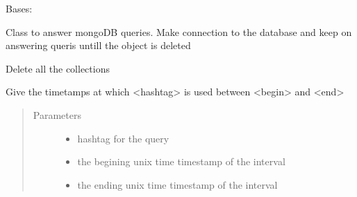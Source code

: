 \documentclass[letterpaper,10pt,english]{sphinxmanual}
\begin{document}
\begin{fulllineitems}
\label{\detokenize{mongoDB_query_generation:execute_queries.MongoQuery}}
Bases: 

Class to answer mongoDB queries. Make connection to the database and keep on answering queris untill the
object is deleted

\begin{fulllineitems}
\label{\detokenize{mongoDB_query_generation:execute_queries.MongoQuery.clear_db}}
Delete all the collections

\end{fulllineitems}


\begin{fulllineitems}
\label{\detokenize{mongoDB_query_generation:execute_queries.MongoQuery.ht_in_interval}}
Give the timetamps at which \textless{}hashtag\textgreater{} is used between \textless{}begin\textgreater{} and \textless{}end\textgreater{}
\begin{quote}\begin{description}
\item[{Parameters}] \leavevmode\begin{itemize}
\item {} 
 \textendash{} hashtag for the query

\item {} 
 \textendash{} the begining unix time timestamp of the interval

\item {} 
 \textendash{} the ending unix time timestamp of the interval

\end{itemize}

\end{description}\end{quote}

\end{fulllineitems}



\end{fulllineitems}
\end{document}
